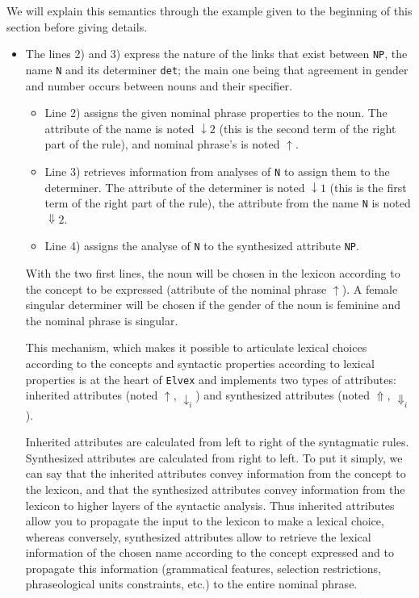 \documentclass[11pt]{article}
\begin{document}
We will explain this semantics through the example given to the
beginning of this section before giving details.

\begin{itemize}
	\item The lines 2) and 3) express the nature of the links that
	      exist between \texttt{NP}, the name \texttt{N} and its determiner
	      \texttt{det}; the main one being that agreement in gender and number
	      occurs between nouns and their specifier.

	      \begin{itemize}
		      \item Line 2) assigns the given nominal phrase properties to the
		            noun. The attribute of the name is noted $\downarrow2$
		            (this is the second term of the right part of the rule), and
		            nominal phrase's is noted $\uparrow$.

		      \item Line 3) retrieves information from analyses of \texttt{N} to
		            assign them to the determiner.  The attribute of the determiner
		            is noted $\downarrow1$ (this is the first term of the right part
		            of the rule), the attribute from the name \texttt{N}
		            is noted $\Downarrow2$.

		      \item Line 4) assigns the analyse of \texttt{N} to the synthesized
		            attribute \texttt{NP}.

	      \end{itemize}

	      With the two first lines, the noun will be chosen in the lexicon
	      according to the concept to be expressed (attribute of the nominal
	      phrase $\uparrow$).  A female singular determiner will be chosen if
	      the gender of the noun is feminine and the nominal phrase is
	      singular.

	      This mechanism, which makes it possible to articulate lexical
	      choices according to the concepts and syntactic properties according
	      to lexical properties is at the heart of \texttt{Elvex} and
	      implements two types of attributes: inherited attributes (noted
	      $\uparrow$, $\downarrow_i$) and synthesized attributes (noted
	      $\Uparrow$, $\Downarrow_i$).

	      Inherited attributes are calculated from left to right of the
	      syntagmatic rules. Synthesized attributes are calculated from right
	      to left. To put it simply, we can say that the inherited attributes
	      convey information from the concept to the lexicon, and that the
	      synthesized attributes convey information from the lexicon to higher
	      layers of the syntactic analysis. Thus inherited attributes allow you to
	      propagate the input to the lexicon to make a lexical choice, whereas
	      conversely, synthesized attributes allow to retrieve the lexical information of
	      the chosen name according to the concept expressed and to propagate
	      this information (grammatical features, selection restrictions,
	      phraseological units constraints, etc.)  to the entire nominal
	      phrase.


\end{itemize}
\end{document}
